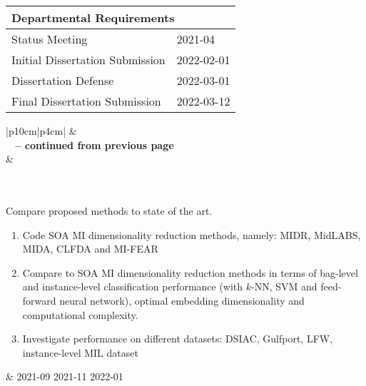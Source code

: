 \begin{longtable}{|p{10cm}|p{4cm}|}
	\hline
	\multicolumn{2}{|l|}{\textbf{Departmental Requirements}} \\
	\hline
	Status Meeting & 2021-04\\
	\hline
	Initial Dissertation Submission & 2022-02-01\\
	\hline
	Dissertation Defense & 2022-03-01\\
	\hline
	Final Dissertation Submission & 2022-03-12\\

\end{longtable}


\begin{longtable}{|p{10cm}|p{4cm}|} 
	\hline {} &  \\ \hline
	\endfirsthead
	{{\bfseries \tablename\ \thetable{} -- continued from previous page}} \\
	\hline {} &  
	\\
	\hline
	\endhead
	\hline {} \\ \hline
	\endfoot
	\hline \hline
	\endlastfoot
	
	\hline
	 \\
	\hline
	Compare proposed methods to state of the art.
	\begin{enumerate}
		\item Code SOA MI dimensionality reduction methods, namely: MIDR, MidLABS, MIDA, CLFDA and MI-FEAR
		\item Compare to SOA MI dimensionality reduction methods in terms of bag-level and instance-level classification performance (with $k$-NN, SVM and feed-forward neural network), optimal embedding dimensionality and computational complexity.
		\item  Investigate performance on different datasets: DSIAC, Gulfport, LFW, instance-level MIL dataset
	\end{enumerate} & \newline \vspace{0.2cm} 2021-09 \newline \vspace{1.2cm} 2021-11 \newline \vspace{2.1cm} 2022-01 \\
	
\end{longtable}

